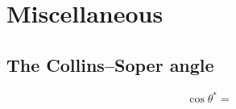 \section{Miscellaneous}
\label{app:miscellaneous}

\subsection{The Collins--Soper angle}
\label{app:the-collins-soper-angle}

\begin{equation}
\cos \theta^* = 
\end{equation}
